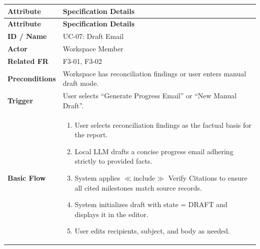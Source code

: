 \begin{longtable}{>{\raggedright\arraybackslash}p{}>{\raggedright\arraybackslash}p{}}

\hline

\rowcolor{tablehead}

\textbf{Attribute} & \textbf{Specification Details} \\ \hline

\endfirsthead

\hline

\rowcolor{tablehead}

\textbf{Attribute} & \textbf{Specification Details} \\ \hline

\endhead

\endfoot

\endlastfoot

\textbf{ID / Name} & UC-07: Draft Email \\ \hline

\textbf{Actor} & Workspace Member \\ \hline

\textbf{Related FR} & F3-01, F3-02 \\ \hline

\textbf{Preconditions} & Workspace has reconciliation findings or user enters manual draft mode. \\ \hline

\textbf{Trigger} & User selects ``Generate Progress Email'' or ``New Manual Draft''. \\ \hline

\textbf{Basic Flow} & \begin{enumerate}[nosep,leftmargin=*,label=\arabic*.]

    \item User selects reconciliation findings as the factual basis for the report.

    \item Local LLM drafts a concise progress email adhering strictly to provided facts.

    \item System applies $\ll\text{include}\gg$ Verify Citations to ensure all cited milestones match source records.

    \item System initializes draft with state = DRAFT and displays it in the editor.

    \item User edits recipients, subject, and body as needed.


\end{enumerate}
\end{longtable}
